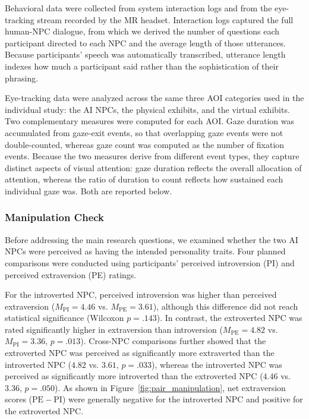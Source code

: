 \documentclass[a4paper,fleqn]{cas-sc}
\begin{document}
Behavioral data were collected from system interaction logs and from the eye-tracking stream recorded by the MR headset. Interaction logs captured the full human-NPC dialogue, from which we derived the number of questions each participant directed to each NPC and the average length of those utterances. Because participants' speech was automatically transcribed, utterance length indexes how much a participant said rather than the sophistication of their phrasing.

Eye-tracking data were analyzed across the same three AOI categories used in the individual study: the AI NPCs, the physical exhibits, and the virtual exhibits. Two complementary measures were computed for each AOI. Gaze duration was accumulated from gaze-exit events, so that overlapping gaze events were not double-counted, whereas gaze count was computed as the number of fixation events. Because the two measures derive from different event types, they capture distinct aspects of visual attention: gaze duration reflects the overall allocation of attention, whereas the ratio of duration to count reflects how sustained each individual gaze was. Both are reported below.

\subsubsection{Manipulation Check}

Before addressing the main research questions, we examined whether the two AI NPCs were perceived as having the intended personality traits. Four planned comparisons were conducted using participants' perceived introversion (PI) and perceived extraversion (PE) ratings.

For the introverted NPC, perceived introversion was higher than perceived extraversion ($M_{\mathrm{PI}} = 4.46$ vs. $M_{\mathrm{PE}} = 3.61$), although this difference did not reach statistical significance (Wilcoxon $p = .143$). In contrast, the extroverted NPC was rated significantly higher in extraversion than introversion ($M_{\mathrm{PE}} = 4.82$ vs. $M_{\mathrm{PI}} = 3.36$, $p = .013$). Cross-NPC comparisons further showed that the extroverted NPC was perceived as significantly more extraverted than the introverted NPC ($4.82$ vs. $3.61$, $p = .033$), whereas the introverted NPC was perceived as significantly more introverted than the extroverted NPC ($4.46$ vs. $3.36$, $p = .050$). As shown in Figure~\ref{fig:pair_manipulation}, net extraversion scores ($\mathrm{PE}-\mathrm{PI}$) were generally negative for the introverted NPC and positive for the extroverted NPC.
\end{document}

